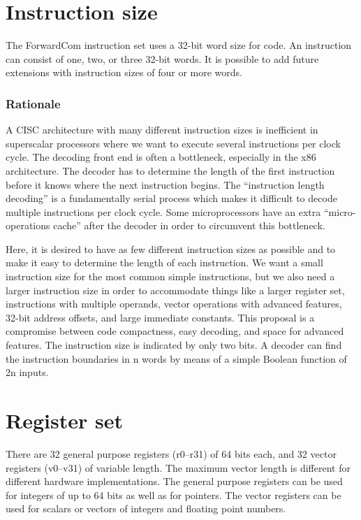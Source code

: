 \documentclass[forwardcom.tex]{subfiles}
\begin{document}
\section{Instruction size}
The ForwardCom instruction set uses a 32-bit word size for code. 
An instruction can consist of one, two, or three 32-bit words. 
It is possible to add future extensions with instruction sizes of four or more words.

\subsubsection{Rationale}
A CISC architecture with many different instruction sizes is inefficient in superscalar processors where we want to execute several instructions per clock cycle. The decoding front end is often a bottleneck, especially in the x86 architecture. The decoder has to determine the length of the first instruction before it knows where the next instruction begins. The ``instruction length decoding'' is a fundamentally serial process which makes it difficult to decode multiple instructions per clock cycle. Some microprocessors have an extra ``micro-operations cache'' after the decoder in order to circumvent this bottleneck.
\vspace{2mm}

Here, it is desired to have as few different instruction sizes as possible and to make it easy to determine the length of each instruction. We want a small instruction size for the most common simple instructions, but we also need a larger instruction size in order to accommodate things like a larger register set, instructions with multiple operands, vector operations with advanced features, 32-bit address offsets, and large immediate constants. This proposal is a compromise between code compactness, easy decoding, and space for advanced features.
The instruction size is indicated by only two bits. A decoder can find the instruction boundaries in n words by means of a simple Boolean function of 2n inputs.

\section{Register set}
There are 32 general purpose registers (r0--r31) of 64 bits each, and 32 vector registers (v0--v31) of variable length. The maximum vector length is different for different hardware implementations. The general purpose registers can be used for integers of up to 64 bits as well as for pointers. The vector registers can be used for scalars or vectors of integers and floating point numbers. 
\vspace{2mm}
\end{document}
